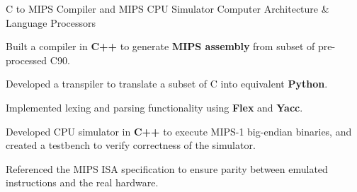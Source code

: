 \begin{cvprojects}
  \cvproject
  {C to MIPS Compiler and MIPS CPU Simulator}
  {Computer Architecture \& Language Processors}
  {
      \begin{cvitems}
          \item Built a compiler in \textbf{C++} to generate \textbf{MIPS assembly} from subset of pre-processed C90.
          \item Developed a transpiler to translate a subset of C into equivalent \textbf{Python}.
          \item Implemented lexing and parsing functionality using \textbf{Flex} and \textbf{Yacc}.
          \item Developed CPU simulator in \textbf{C++} to execute MIPS-1 big-endian binaries, and created a testbench to verify correctness of the simulator.
        \item Referenced the MIPS ISA specification to ensure parity between emulated instructions and the real hardware.
    \end{cvitems}
}







\end{cvprojects}
